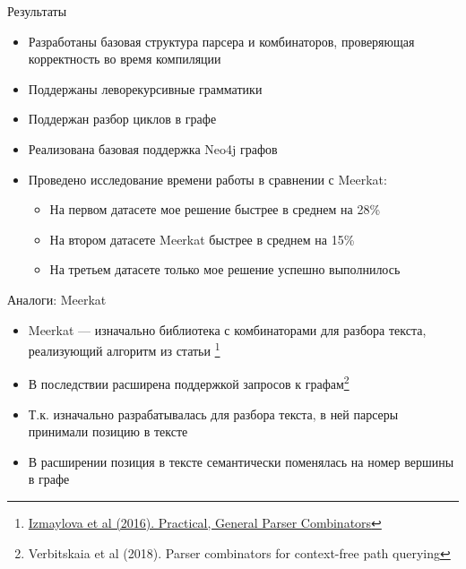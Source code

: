 \documentclass[aspectratio=169]{beamer}
\begin{document}
\begin{frame}{Результаты}
  \begin{itemize}
    \item Разработаны базовая структура парсера и комбинаторов, проверяющая корректность во время компиляции
    \item Поддержаны леворекурсивные грамматики
    \item Поддержан разбор циклов в графе
    \item Реализована базовая поддержка Neo4j графов
    \item Проведено исследование времени работы в сравнении с Meerkat:
          \begin{itemize}
            \item На первом датасете мое решение быстрее в среднем на 28\%
            \item На втором датасете Meerkat быстрее в среднем на 15\%
            \item На третьем датасете только мое решение успешно выполнилось
          \end{itemize}
  \end{itemize}
\end{frame}


\appendix


\begin{frame}{Аналоги: Meerkat}
  \begin{itemize}
    \item Meerkat --- изначально библиотека с комбинаторами для разбора текста, реализующий алгоритм из статьи \footnote[1]{\href{https://dl.acm.org/doi/10.1145/2847538.2847539}
            {Izmaylova et al (2016). Practical, General Parser Combinators}}
    \item В последствии расширена поддержкой запросов к графам\footnote[2]{Verbitskaia et al (2018). Parser combinators for context-free path querying}
    \item Т.к. изначально разрабатывалась для разбора текста, в ней парсеры принимали позицию в тексте
    \item В расширении позиция в тексте семантически поменялась на номер вершины в графе
  \end{itemize}
\end{frame}
\end{document}
